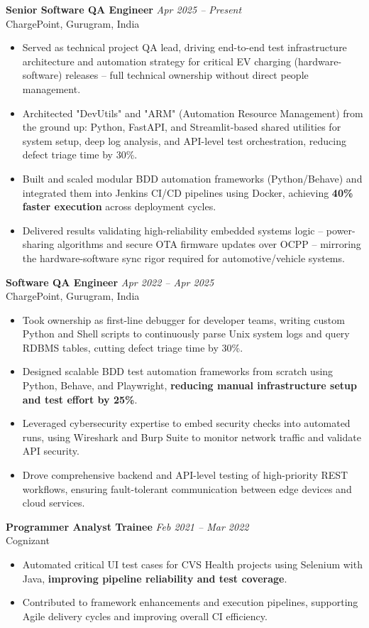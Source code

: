 \documentclass[a4paper,10pt]{article}
\begin{document}
\textbf{Senior Software QA Engineer} \hfill \textit{Apr 2025 -- Present}\\
ChargePoint, Gurugram, India
\begin{itemize}
    \item Served as technical project QA lead, driving end-to-end test infrastructure architecture and automation strategy for critical EV charging (hardware-software) releases -- full technical ownership without direct people management.
    \item Architected "DevUtils" and "ARM" (Automation Resource Management) from the ground up: Python, FastAPI, and Streamlit-based shared utilities for system setup, deep log analysis, and API-level test orchestration, reducing defect triage time by 30\%.
    \item Built and scaled modular BDD automation frameworks (Python/Behave) and integrated them into Jenkins CI/CD pipelines using Docker, achieving \textbf{40\% faster execution} across deployment cycles.
    \item Delivered results validating high-reliability embedded systems logic -- power-sharing algorithms and secure OTA firmware updates over OCPP -- mirroring the hardware-software sync rigor required for automotive/vehicle systems.
\end{itemize}

\textbf{Software QA Engineer} \hfill \textit{Apr 2022 -- Apr 2025}\\
ChargePoint, Gurugram, India
\begin{itemize}
    \item Took ownership as first-line debugger for developer teams, writing custom Python and Shell scripts to continuously parse Unix system logs and query RDBMS tables, cutting defect triage time by 30\%.
    \item Designed scalable BDD test automation frameworks from scratch using Python, Behave, and Playwright, \textbf{reducing manual infrastructure setup and test effort by 25\%}.
    \item Leveraged cybersecurity expertise to embed security checks into automated runs, using Wireshark and Burp Suite to monitor network traffic and validate API security.
    \item Drove comprehensive backend and API-level testing of high-priority REST workflows, ensuring fault-tolerant communication between edge devices and cloud services.
\end{itemize}

\textbf{Programmer Analyst Trainee} \hfill \textit{Feb 2021 -- Mar 2022}\\
Cognizant
\begin{itemize}
    \item Automated critical UI test cases for CVS Health projects using Selenium with Java, \textbf{improving pipeline reliability and test coverage}.
    \item Contributed to framework enhancements and execution pipelines, supporting Agile delivery cycles and improving overall CI efficiency.
\end{itemize}
\end{document}
